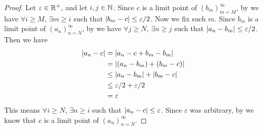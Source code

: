 \begin{proof}
  Let \(\varepsilon \in \mathbb{R}^+\), and let \(i, j \in \mathbb{N}\).
  Since \(c\) is a limit point of \((b_m)_{m = M}^\infty\), by  we have \(\forall i \geq M\), \(\exists m \geq i\) such that \(\left\lvert b_m - c\right\rvert \leq \varepsilon / 2\).
  Now we fix such \(m\).
  Since \(b_m\) is a limit point of \((a_n)_{n = N}^\infty\), by  we have \(\forall j \geq N\), \(\exists n \geq j\) such that \(\left\lvert a_n - b_m\right\rvert \leq \varepsilon / 2\).
  Then we have
  \begin{align*}
    \left\lvert a_n - c\right\rvert & = \left\lvert a_n - c + b_m - b_m\right\rvert            \\
                  & = \left\lvert(a_n - b_m) + (b_m - c)\right\rvert        \\
                  & \leq \left\lvert a_n - b_m\right\rvert + \left\lvert b_m - c\right\rvert   \\
                  & \leq \varepsilon / 2 + \varepsilon / 2 \\
                  & = \varepsilon
  \end{align*}
  This means \(\forall i \geq N\), \(\exists n \geq i\) such that \(\left\lvert a_n - c\right\rvert \leq \varepsilon\).
  Since \(\varepsilon\) was arbitrary, by  we know that \(c\) is a limit point of \((a_n)_{n = N}^\infty\).
\end{proof}
